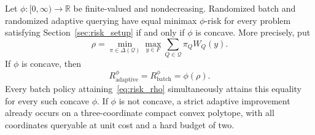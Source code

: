 \begin{proposition}
\label{prop:risk_classification}
Let $\phi:[0,\infty)\to\mathbb R$ be finite-valued and nondecreasing.
Randomized batch and randomized adaptive querying have equal minimax
$\phi$-risk for every problem satisfying Section~\ref{sec:risk_setup}
if and only if $\phi$ is concave. More precisely, put
\begin{equation}
 \rho=\min_{\pi\in\Delta(\mathcal Q)}\max_{y\in F}
         \sum_{Q\in\mathcal Q}\pi_Q W_Q(y).
 \label{eq:risk_rho}
\end{equation}
If $\phi$ is concave, then
\begin{equation}
 R_{\mathrm{adaptive}}^{\phi}
 =R_{\mathrm{batch}}^{\phi}=\phi(\rho).
 \label{eq:risk_concave_value}
\end{equation}
Every batch policy attaining~\eqref{eq:risk_rho} simultaneously attains
this equality for every such concave $\phi$. If $\phi$ is not concave,
a strict adaptive improvement already occurs on a three-coordinate
compact convex polytope, with all coordinates queryable at unit cost
and a hard budget of two.
\end{proposition}
